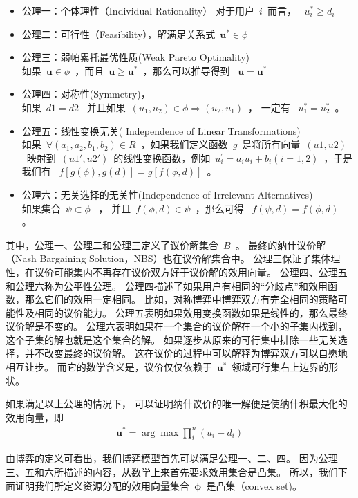 \begin{itemize}
\item 公理一：个体理性（Individual Rationality） 
    对于用户~$i$~而言， ~$u_i^* \ge d_i$~
\item 公理二：可行性（Feasibility），解满足关系式~$\mathbf{u}^* \in \phi$~
\item 公理三：弱帕累托最优性质(Weak Pareto Optimality)\\
如果~$\mathbf{u} \in \phi$~，而且~$\mathbf{u} \ge \mathbf{u}^*$~，那么可以推导得到 ~$\mathbf{u} = \mathbf{u}^*$~
\item 公理四：对称性(Symmetry)，\\
如果~$d1=d2$~ 并且如果~$(u_1, u_2) \in \phi \Rightarrow (u_2, u_1) $~， 一定有 ~$u_1^*= u_2^*$~。
\item 公理五：线性变换无关( Independence of Linear Transformations)\\ 
如果~$\forall (a_1, a_2, b_1, b_2) \in R$~，如果我们定义函数~$g$~是将所有向量~$(u1, u2)$~映射到~$(u1', u2')$~的线性变换函数，例如~$u_i^\prime=a_iu_i+ b_i (i =1,2)$~，于是我们有 ~$f[g(\phi), g(d)]=g[f(\phi , d)]$~。
\item 公理六：无关选择的无关性(Independence of Irrelevant Alternatives) \\
如果集合~$\psi \subset \phi$~ ，
并且~$f(\phi,d) \in \psi$~，那么可得 ~$f(\psi,d) = f(\phi,d)$~ 。
\end{itemize}
其中，公理一、公理二和公理三定义了议价解集合~$B$~。
最终的纳什议价解（Nash Bargaining Solution，NBS）也在议价解集合中。
公理三保证了集体理性，在议价可能集内不再存在议价双方好于议价解的效用向量。
公理四、公理五和公理六称为公平性公理。
公理四描述了如果用户有相同的“分歧点”和效用函数，那么它们的效用一定相同。
比如，对称博弈中博弈双方有完全相同的策略可能性及相同的议价能力。
公理五表明如果效用变换函数如果是线性的，那么最终议价解是不变的。
公理六表明如果在一个集合的议价解在一个小的子集内找到，这个子集的解也就是这个集合的解。
如果逐步从原来的可行集中排除一些无关选择，并不改变最终的议价解。
这在议价的过程中可以解释为博弈双方可以自愿地相互让步。
而它的数学含义是，议价仅仅依赖于~$\mathbf{u}^*$~领域可行集右上边界的形状。

如果满足以上公理的情况下，
可以证明纳什议价的唯一解便是使纳什积最大化的效用向量\cite{Nash_1950}，即
\begin{align}
\mathbf{u}^* = \arg \max \prod_i^n (u_i-d_i)
\label{eqn:chap_nash:nash_product}
\end{align}


由博弈的定义可看出，我们博弈模型首先可以满足公理一、二、四。
因为公理三、五和六所描述的内容，从数学上来首先要求效用集合是凸集。
所以，我们下面证明我们所定义资源分配的效用向量集合~$\mathbf{\phi}$~是凸集（convex set)。

